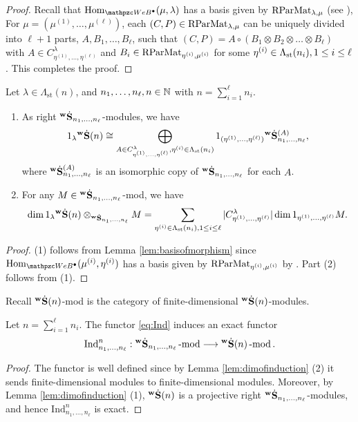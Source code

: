 \begin{proof}
    Recall that $\Hom_{\qAW}(\mu,\lambda)$ has a basis given by 
    $\text{RParMat}_{\lambda,\mu}$ (see \cite[Theorem ~4.16]{SSW25}), For $\mu= (\mu^{(1)}, \ldots, \mu^{(\ell)})$, each $(C,P)\in \text{RParMat}_{\lambda,\mu}$ can be uniquely divided into $\ell+1$ parts, $A, B_1,\ldots, B_\ell$, such that 
    $ (C,P)= A\circ (B_1\otimes B_2\otimes \ldots \otimes B_\ell)$ with  $ A\in C_{\eta^{(1)},\ldots,\eta^{(\ell)}}^\lambda$ and $B_i \in \text{RParMat}_{\eta^{(i)},\mu^{(i)}}$ for some $\eta^{(i)}\in \Lambda_{\text{st}}(n_i), 1\le i\le \ell $.
This completes the proof.    
\end{proof}

\begin{lemma}
\label{lem:dimofinduction}
Let $\lambda\in\Lambda_{\text{st}}(n)$, and $n_1,\ldots, n_\ell, n \in \mathbb{N}$ with $n=\sum_{i=1}^\ell n_i$. 
\begin{enumerate}
\item 
As right ${}^{\bold{w}}\dot{\bold{S}}_{n_1,\ldots,n_\ell}$-modules, we have
    \[
    1_\lambda {}^{\bold{w}}\dot{\bold{S}}(n)\cong
    \bigoplus_{A\in C^\lambda_{\eta^{(1)},\ldots,\eta^{(\ell)}}, \eta^{(i)}\in \Lambda_{\text{st}}(n_i)} 1_{(\eta^{(1)},\ldots,\eta^{(\ell)})} {}^{\bold{w}}\dot{\bold{S}}_{n_1,\ldots,n_\ell}^{(A)},
    \]
    where ${}^{\bold{w}}\dot{\bold{S}}_{n_1,\ldots,n_\ell}^{(A)}$ is an isomorphic copy of ${}^{\bold{w}}\dot{\bold{S}}_{n_1,\ldots,n_\ell}$ for each $A$.
    \item For any $M\in {}^{\bold{w}}\dot{\bold{S}}_{n_1,\ldots,n_\ell}$-mod, we have 
    \[\dim 1_\lambda {}^{\bold{w}}\dot{\bold{S}}(n)\otimes_{{}^{\bold{w}}\dot{\bold{S}}_{n_1,\ldots,n_\ell}}M= \sum_{\eta^{(i)}\in \Lambda_{\text{st}}(n_i),1\le i\le \ell}|C^\lambda_{\eta^{(1)},\ldots,\eta^{(\ell)}}| \dim 1_{\eta^{(1)},\ldots,\eta^{(\ell)}}M.  \]
\end{enumerate}
\end{lemma}

\begin{proof}
 (1) follows from Lemma \ref{lem:basisofmorphism} since 
 $\Hom_{\qAW}(\mu^{(i)},\eta^{(i)})$ has a basis given by $\text{RParMat}_{\eta^{(i)},\mu^{(i)}}$ by 
  \cite{SSW25}. Part (2) follows from (1).
\end{proof}
Recall ${}^{\bold{w}}\dot{\bold{S}}(n)$-mod is the category of finite-dimensional ${}^{\bold{w}}\dot{\bold{S}}(n)$-modules. 

\begin{corollary}
Let $n=\sum_{i=1}^\ell n_i$.  
  The functor \eqref{eq:Ind} induces an exact functor 
  \[
  \operatorname{Ind}\nolimits_{n_1,\ldots,n_\ell}^n: {}^{\bold{w}}\dot{\bold{S}}_{n_1,\ldots,n_\ell}\operatorname{-mod}\nolimits \longrightarrow {}^{\bold{w}}\dot{\bold{S}}(n)\operatorname{-mod}\nolimits.
  \]
\end{corollary}

 \begin{proof}
   The functor is well defined since by Lemma \ref{lem:dimofinduction} (2) it sends finite-dimensional modules to finite-dimensional modules. Moreover, by Lemma \ref{lem:dimofinduction} (1), ${}^{\bold{w}}\dot{\bold{S}}(n)$ is a projective right ${}^{\bold{w}}\dot{\bold{S}}_{n_1,\ldots,n_\ell}$-modules, and hence $\text{Ind}_{n_1,\ldots,n_\ell}^n$ is exact. \end{proof}   

